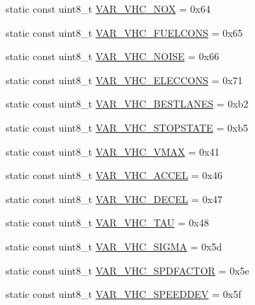 \begin{DoxyCompactItemize}
\item 
static const uint8\+\_\+t \hyperlink{classtraci__api_1_1_vehicle_manager_a52073a98f8b4cd039209a84f8fece983}{V\+A\+R\+\_\+\+V\+H\+C\+\_\+\+N\+OX} = 0x64
\item 
static const uint8\+\_\+t \hyperlink{classtraci__api_1_1_vehicle_manager_a2feb4c2aeaf374f8c1fbe85a6454ebb4}{V\+A\+R\+\_\+\+V\+H\+C\+\_\+\+F\+U\+E\+L\+C\+O\+NS} = 0x65
\item 
static const uint8\+\_\+t \hyperlink{classtraci__api_1_1_vehicle_manager_a8a0d3fdb9304ddf489d123d7ca8f22ea}{V\+A\+R\+\_\+\+V\+H\+C\+\_\+\+N\+O\+I\+SE} = 0x66
\item 
static const uint8\+\_\+t \hyperlink{classtraci__api_1_1_vehicle_manager_ad024b88f1fc94552b00883340f376440}{V\+A\+R\+\_\+\+V\+H\+C\+\_\+\+E\+L\+E\+C\+C\+O\+NS} = 0x71
\item 
static const uint8\+\_\+t \hyperlink{classtraci__api_1_1_vehicle_manager_a4318c2219a5f58300d7b263c50ec38b5}{V\+A\+R\+\_\+\+V\+H\+C\+\_\+\+B\+E\+S\+T\+L\+A\+N\+ES} = 0xb2
\item 
static const uint8\+\_\+t \hyperlink{classtraci__api_1_1_vehicle_manager_aeb39f34fdafd857f65b4837489b78d2c}{V\+A\+R\+\_\+\+V\+H\+C\+\_\+\+S\+T\+O\+P\+S\+T\+A\+TE} = 0xb5
\item 
static const uint8\+\_\+t \hyperlink{classtraci__api_1_1_vehicle_manager_a89242125de907c71bf7b357a7f63acdd}{V\+A\+R\+\_\+\+V\+H\+C\+\_\+\+V\+M\+AX} = 0x41
\item 
static const uint8\+\_\+t \hyperlink{classtraci__api_1_1_vehicle_manager_ac9d949b248fbdb168796e0213357e003}{V\+A\+R\+\_\+\+V\+H\+C\+\_\+\+A\+C\+C\+EL} = 0x46
\item 
static const uint8\+\_\+t \hyperlink{classtraci__api_1_1_vehicle_manager_a4c88c070e03fd1b4bbc7684935d5d36d}{V\+A\+R\+\_\+\+V\+H\+C\+\_\+\+D\+E\+C\+EL} = 0x47
\item 
static const uint8\+\_\+t \hyperlink{classtraci__api_1_1_vehicle_manager_ae44405763fa9729d5f6b93fb54e1c75a}{V\+A\+R\+\_\+\+V\+H\+C\+\_\+\+T\+AU} = 0x48
\item 
static const uint8\+\_\+t \hyperlink{classtraci__api_1_1_vehicle_manager_a11f1a4ab7243f294be9ce37c889bf018}{V\+A\+R\+\_\+\+V\+H\+C\+\_\+\+S\+I\+G\+MA} = 0x5d
\item 
static const uint8\+\_\+t \hyperlink{classtraci__api_1_1_vehicle_manager_a5645ab4fd7d6938f57beda01a79f5b86}{V\+A\+R\+\_\+\+V\+H\+C\+\_\+\+S\+P\+D\+F\+A\+C\+T\+OR} = 0x5e
\item 
static const uint8\+\_\+t \hyperlink{classtraci__api_1_1_vehicle_manager_a536289815e37b9023217ade7d1cd9e84}{V\+A\+R\+\_\+\+V\+H\+C\+\_\+\+S\+P\+E\+E\+D\+D\+EV} = 0x5f

\end{DoxyCompactItemize}
